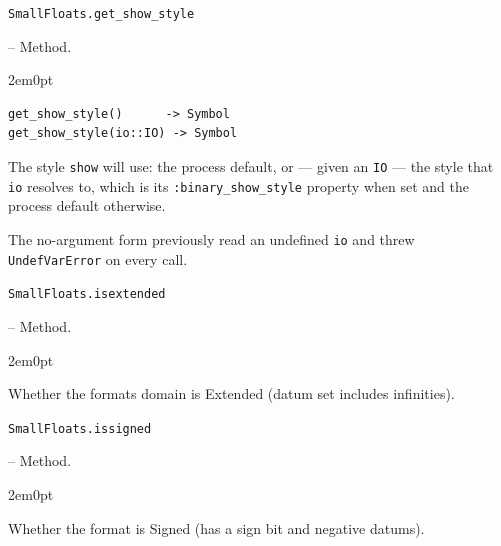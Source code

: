 \par\medskip\noindent\begin{minipage}{\linewidth}
\hypertarget{16179625954962935066}{\texttt{SmallFloats.get\_\allowbreak{}show\_\allowbreak{}style}}  -- {Method.}
\nopagebreak
\begin{adjustwidth}{2em}{0pt}


\begin{verbatim}
get_show_style()      -> Symbol
get_show_style(io::IO) -> Symbol
\end{verbatim}

The style \texttt{show} will use: the process default, or — given an \texttt{IO} — the style that \texttt{io} resolves to, which is its \texttt{:binary\_\allowbreak{}show\_\allowbreak{}style} property when set and the process default otherwise.

The no-argument form previously read an undefined \texttt{io} and threw \texttt{UndefVarError} on every call.



\end{adjustwidth}
\end{minipage}
\par\medskip

\par\medskip\noindent\begin{minipage}{\linewidth}
\hypertarget{16681316778131404680}{\texttt{SmallFloats.isextended}}  -- {Method.}
\nopagebreak
\begin{adjustwidth}{2em}{0pt}

Whether the format{\textquotesingle}s domain is Extended (datum set includes infinities).



\end{adjustwidth}
\end{minipage}
\par\medskip

\par\medskip\noindent\begin{minipage}{\linewidth}
\hypertarget{3128287096853498551}{\texttt{SmallFloats.issigned}}  -- {Method.}
\nopagebreak
\begin{adjustwidth}{2em}{0pt}

Whether the format is Signed (has a sign bit and negative datums).



\end{adjustwidth}
\end{minipage}
\par\medskip

